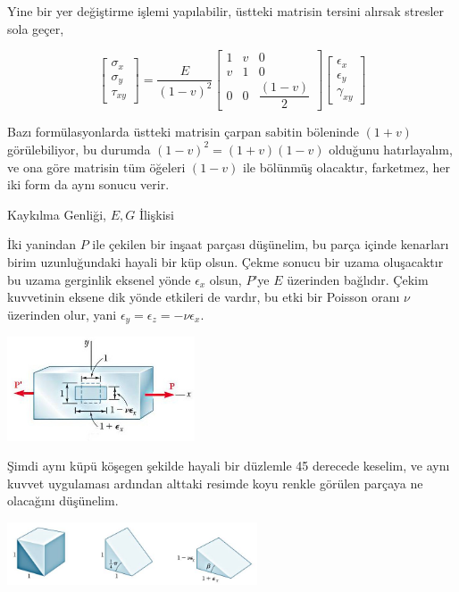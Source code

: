 \documentclass[12pt,fleqn]{article}\usepackage{../../common}
\begin{document}
Yine bir yer değiştirme işlemi yapılabilir, üstteki matrisin tersini alırsak
stresler sola geçer, 

$$
\left[\begin{array}{c}
\sigma_x \\ \sigma_y \\ \tau_{xy}
\end{array}\right] = 
\frac{E}{(1-v)^2}
\left[\begin{array}{ccc}
1 & v & 0 \\ v & 1 & 0 \\ 0 & 0 & \dfrac{(1-v)}{2}
\end{array}\right]
\left[\begin{array}{c}
\epsilon_{x} \\ \epsilon_{y} \\ \gamma_{xy}
\end{array}\right] 
$$

Bazı formülasyonlarda üstteki matrisin çarpan sabitin böleninde $(1+v)$
görülebiliyor, bu durumda $(1-v)^2=(1+v)(1-v)$ olduğunu hatırlayalım, ve ona
göre matrisin tüm öğeleri $(1-v)$ ile bölünmüş olacaktır, farketmez, her iki
form da aynı sonucu verir.

Kaykılma Genliği, $E,G$ İlişkisi

İki yanindan $P$ ile çekilen bir inşaat parçası düşünelim, bu parça içinde
kenarları birim uzunluğundaki hayali bir küp olsun. Çekme sonucu bir uzama
oluşacaktır bu uzama gerginlik eksenel yönde $\epsilon_x$ olsun, $P$'ye
$E$ üzerinden bağlıdır. Çekim kuvvetinin eksene dik yönde etkileri de vardır,
bu etki bir Poisson oranı $\nu$ üzerinden olur, yani
$\epsilon_y = \epsilon_z = -\nu \epsilon_x$.

\includegraphics[width=15em]{phy_020_strs_06_07.jpg}

Şimdi aynı küpü köşegen şekilde hayali bir düzlemle 45 derecede keselim, ve aynı
kuvvet uygulaması ardından alttaki resimde koyu renkle görülen parçaya
ne olacağını düşünelim.

\includegraphics[width=20em]{phy_020_strs_06_08.jpg}
\end{document}
